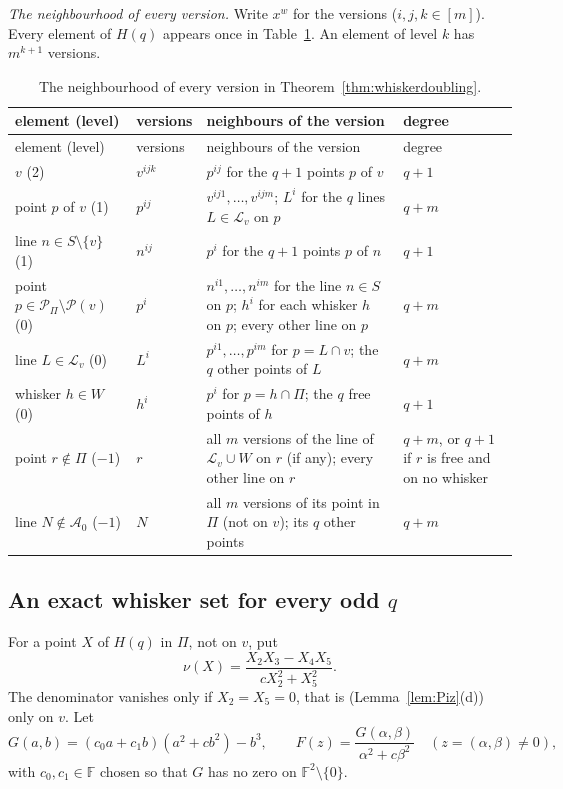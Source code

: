 \documentclass[11pt]{amsart}
\theoremstyle{definition}
\theoremstyle{remark}
\numberwithin{equation}{section}
\newcommand{\F}{\mathbb F}
\newcommand{\cA}{\mathcal A}
\newcommand{\cL}{\mathcal L}
\newcommand{\cP}{\mathcal P}
\begin{document}
\emph{The neighbourhood of every version.} Write $x^w$ for the versions ($i,j,k\in[m]$). Every element of $H(q)$
appears once in Table~\ref{tab:versions}. An element of level $k$ has $m^{k+1}$ versions.

\begin{longtable}{@{}p{3.3cm} l p{5.6cm} p{2.2cm}@{}}
\caption{The neighbourhood of every version in Theorem~\ref{thm:whiskerdoubling}.}\label{tab:versions}\\
\toprule element (level) & versions & neighbours of the version & degree\\ \midrule\endfirsthead
\toprule element (level) & versions & neighbours of the version & degree\\ \midrule\endhead
\bottomrule\endfoot
$v$ (2) & $v^{ijk}$ & $p^{ij}$ for the $q+1$ points $p$ of $v$ & $q+1$\\
point $p$ of $v$ (1) & $p^{ij}$ & $v^{ij1},\dots,v^{ijm}$; $L^i$ for the $q$ lines $L\in\cL_v$ on $p$ & $q+m$\\
line $n\in S\setminus\{v\}$ (1) & $n^{ij}$ & $p^i$ for the $q+1$ points $p$ of $n$ & $q+1$\\
point $p\in\cP_\Pi\setminus\cP(v)$ (0) & $p^i$ & $n^{i1},\dots,n^{im}$ for the line $n\in S$ on $p$; $h^i$ for each whisker $h$ on $p$; every other line on $p$ & $q+m$\\
line $L\in\cL_v$ (0) & $L^i$ & $p^{i1},\dots,p^{im}$ for $p=L\cap v$; the $q$ other points of $L$ & $q+m$\\
whisker $h\in W$ (0) & $h^i$ & $p^i$ for $p=h\cap\Pi$; the $q$ free points of $h$ & $q+1$\\
point $r\notin\Pi$ ($-1$) & $r$ & all $m$ versions of the line of $\cL_v\cup W$ on $r$ (if any); every other line on $r$ & $q+m$, or $q+1$ if $r$ is free and on no whisker\\
line $N\notin\cA_0$ ($-1$) & $N$ & all $m$ versions of its point in $\Pi$ (not on $v$); its $q$ other points & $q+m$\\
\end{longtable}

\subsection{An exact whisker set for every odd $q$}
For a point $X$ of $H(q)$ in $\Pi$, not on $v$, put
\[
\nu(X)=\frac{X_2X_3-X_4X_5}{cX_2^2+X_5^2}.
\]
The denominator vanishes only if $X_2=X_5=0$, that is (Lemma~\ref{lem:Piz}(d)) only on $v$. Let
\[
G(a,b)=(c_0a+c_1b)(a^2+cb^2)-b^3,\qquad F(z)=\frac{G(\alpha,\beta)}{\alpha^2+c\beta^2}\quad(z=(\alpha,\beta)\ne0),
\]
with $c_0,c_1\in\F$ chosen so that $G$ has no zero on $\F^2\setminus\{0\}$.
\end{document}

